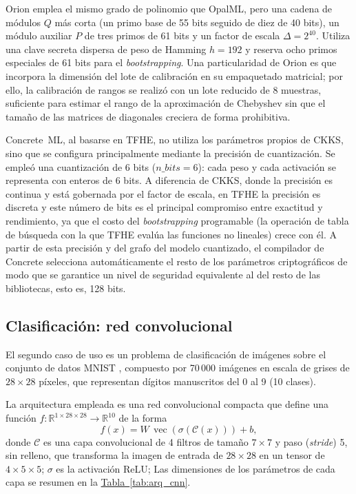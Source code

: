 Orion emplea el mismo grado de polinomio que OpalML, pero una cadena de módulos $Q$ más corta (un primo base de 55 bits seguido de diez de 40 bits), un módulo auxiliar $P$ de tres primos de 61 bits y un factor de escala $\Delta = 2^{40}$. Utiliza una clave secreta dispersa de peso de Hamming $h = 192$ y reserva ocho primos especiales de 61 bits para el \textit{bootstrapping}. Una particularidad de Orion es que incorpora la dimensión del lote de calibración en su empaquetado matricial; por ello, la calibración de rangos se realizó con un lote reducido de 8 muestras, suficiente para estimar el rango de la aproximación de Chebyshev sin que el tamaño de las matrices de diagonales creciera de forma prohibitiva.

Concrete~ML, al basarse en TFHE, no utiliza los parámetros propios de CKKS, sino que se configura principalmente mediante la precisión de cuantización. Se empleó una cuantización de 6 bits ($n\_bits = 6$): cada peso y cada activación se representa con enteros de 6 bits. A diferencia de CKKS, donde la precisión es continua y está gobernada por el factor de escala, en TFHE la precisión es discreta y este número de bits es el principal compromiso entre exactitud y rendimiento, ya que el costo del \textit{bootstrapping} programable (la operación de tabla de búsqueda con la que TFHE evalúa las funciones no lineales) crece con él. A partir de esta precisión y del grafo del modelo cuantizado, el compilador de Concrete selecciona automáticamente el resto de los parámetros criptográficos de modo que se garantice un nivel de seguridad equivalente al del resto de las bibliotecas, esto es, 128 bits.

\subsection{Clasificación: red convolucional}

El segundo caso de uso es un problema de clasificación de imágenes sobre el conjunto de datos MNIST \cite{lecun1998mnist}, compuesto por 70\,000 imágenes en escala de grises de $28 \times 28$ píxeles, que representan dígitos manuscritos del 0 al 9 (10 clases).

La arquitectura empleada es una red convolucional compacta que define una función $f : \mathbb{R}^{1 \times 28 \times 28} \to \mathbb{R}^{10}$ de la forma
\[
f(x) = W \, \operatorname{vec}\!\left(\sigma\!\left(\mathcal{C}(x)\right)\right) + b,
\]
donde $\mathcal{C}$ es una capa convolucional de 4 filtros de tamaño $7 \times 7$ y paso (\textit{stride}) 5, sin relleno, que transforma la imagen de entrada de $28 \times 28$ en un tensor de $4 \times 5 \times 5$; $\sigma$ es la activación ReLU; Las dimensiones de los parámetros de cada capa se resumen en la \hyperref[tab:arq_cnn]{Tabla~\ref{tab:arq_cnn}}.

